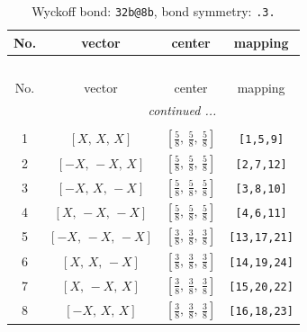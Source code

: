 \documentclass[fleqn,8pt]{jsarticle}
\begin{document}
\renewcommand{\arraystretch}{1.2}
\begin{longtable}{cccc}
\caption{Wyckoff bond: {\tt 32b@8b}, bond symmetry: {\tt .3.}}
 \\
 \hline \hline
No. & vector & center & mapping \\ \hline \endfirsthead

\multicolumn{3}{l}{\tablename\ \thetable{}} \\
 \hline \hline
No. & vector & center & mapping \\ \hline \endhead

 \hline \hline
\multicolumn{3}{r}{\footnotesize\it continued ...} \\ \endfoot

 \hline \hline
\multicolumn{3}{r}{} \\ \endlastfoot

1 & $\left[ X,\, X,\, X \right]$ & $\left[ \frac{5}{8},\, \frac{5}{8},\, \frac{5}{8} \right]$ & {\tt [1,5,9]} \\ \hline
2 & $\left[ - X,\, - X,\, X \right]$ & $\left[ \frac{5}{8},\, \frac{5}{8},\, \frac{5}{8} \right]$ & {\tt [2,7,12]} \\ \hline
3 & $\left[ - X,\, X,\, - X \right]$ & $\left[ \frac{5}{8},\, \frac{5}{8},\, \frac{5}{8} \right]$ & {\tt [3,8,10]} \\ \hline
4 & $\left[ X,\, - X,\, - X \right]$ & $\left[ \frac{5}{8},\, \frac{5}{8},\, \frac{5}{8} \right]$ & {\tt [4,6,11]} \\ \hline
5 & $\left[ - X,\, - X,\, - X \right]$ & $\left[ \frac{3}{8},\, \frac{3}{8},\, \frac{3}{8} \right]$ & {\tt [13,17,21]} \\ \hline
6 & $\left[ X,\, X,\, - X \right]$ & $\left[ \frac{3}{8},\, \frac{3}{8},\, \frac{3}{8} \right]$ & {\tt [14,19,24]} \\ \hline
7 & $\left[ X,\, - X,\, X \right]$ & $\left[ \frac{3}{8},\, \frac{3}{8},\, \frac{3}{8} \right]$ & {\tt [15,20,22]} \\ \hline
8 & $\left[ - X,\, X,\, X \right]$ & $\left[ \frac{3}{8},\, \frac{3}{8},\, \frac{3}{8} \right]$ & {\tt [16,18,23]} \\
\end{longtable}
\renewcommand{\arraystretch}{1.2}
\end{document}
